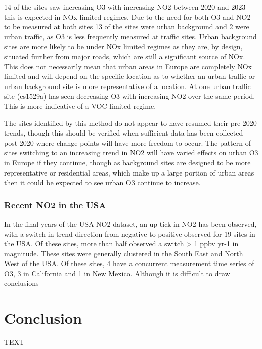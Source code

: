 \documentclass[journal abbreviation, manuscript]{copernicus}
\begin{document}
14 of the sites saw increasing O3 with increasing NO2 between 2020 and 2023 - this is expected in NOx limited regimes. Due to the need for both O3 and NO2 to be measured at both sites 13 of the sites were urban background and 2 were urban traffic, as O3 is less frequently measured at traffic sites. Urban background sites are more likely to be under NOx limited regimes as they are, by design, situated further from major roads, which are still a significant source of NOx. This does not necessarily mean that urban areas in Europe are completely NOx limited and will depend on the specific location as to whether an urban traffic or urban background site is more representative of a location. At one urban traffic site (es1529a) has seen decreasing O3 with increasing NO2 over the same period. This is more indicative of a VOC limited regime. 


The sites identified by this method do not appear to have resumed their pre-2020 trends, though this should be verified when sufficient data has been collected post-2020 where change points will have more freedom to occur. The pattern of sites switching to an increasing trend in NO2 will have varied effects on urban O3 in Europe if they continue, though as background sites are designed to be more representative or residential areas, which make up a large portion of urban areas then it could be expected to see urban O3 continue to increase. 



\subsubsection{Recent NO2 in the USA} 
In the final years of the USA NO2 dataset, an up-tick in NO2 has been observed, with a switch in trend direction from negative to positive observed for 19 sites in the USA. Of these sites, more than half observed a switch > 1 ppbv yr-1 in magnitude. These sites were generally clustered in the South East and North West of the USA. Of these sites, 4 have a concurrent measurement time series of O3, 3 in California and 1 in New Mexico. Although it is difficult to draw conclusions 

\section{Conclusion}  %
TEXT

\end{document}
